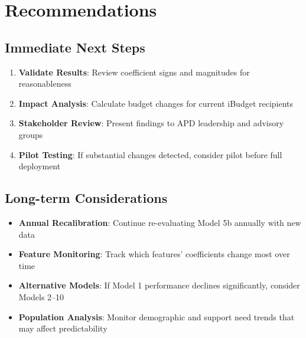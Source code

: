 \section{Recommendations}

\subsection{Immediate Next Steps}

\begin{enumerate}
    \item \textbf{Validate Results}: Review coefficient signs and magnitudes for reasonableness
    \item \textbf{Impact Analysis}: Calculate budget changes for current iBudget recipients
    \item \textbf{Stakeholder Review}: Present findings to APD leadership and advisory groups
    \item \textbf{Pilot Testing}: If substantial changes detected, consider pilot before full deployment
\end{enumerate}

\subsection{Long-term Considerations}

\begin{itemize}
    \item \textbf{Annual Recalibration}: Continue re-evaluating Model 5b annually with new data
    \item \textbf{Feature Monitoring}: Track which features' coefficients change most over time
    \item \textbf{Alternative Models}: If Model 1 performance declines significantly, consider Models 2--10
    \item \textbf{Population Analysis}: Monitor demographic and support need trends that may affect predictability
\end{itemize}




